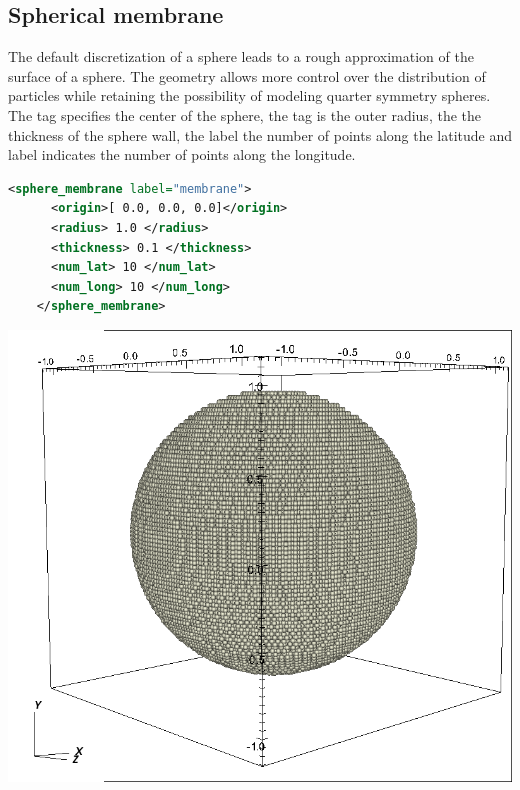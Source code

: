 \subsection{Spherical membrane}
\begin{minipage}{0.6\textwidth}
  The default discretization of a sphere leads to a rough approximation of the 
  surface of a sphere.  The  geometry allows more
  control over the distribution of particles while retaining the possibility
  of modeling quarter symmetry spheres.  The  tag specifies
  the center of the sphere, the  tag is the outer radius, 
  the  the thickness of the sphere wall, the 
   label the number of points along the latitude and
   label indicates the number of points along the longitude.
  \begin{lstlisting}[language=XML]
    <sphere_membrane label="membrane">
      <origin>[ 0.0, 0.0, 0.0]</origin>
      <radius> 1.0 </radius>
      <thickness> 0.1 </thickness>
      <num_lat> 10 </num_lat>
      <num_long> 10 </num_long>
    </sphere_membrane>
  \end{lstlisting}
\end{minipage}
\hspace{12pt}
\begin{minipage}{0.35\textwidth}
  \centering
  \includegraphics[width=0.7\columnwidth]{FIGS/geometry/geom_sph_mem.png}
\end{minipage}

